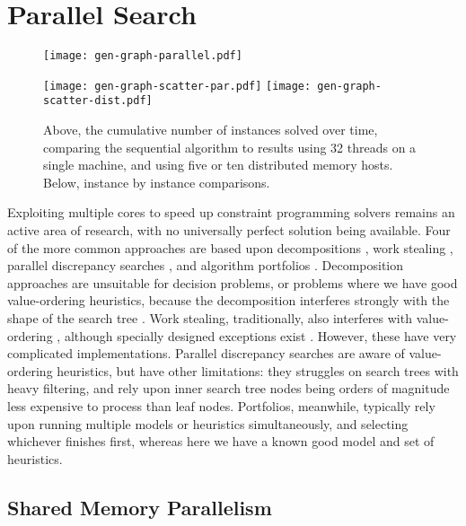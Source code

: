 \documentclass[runningheads]{llncs}
\begin{document}
\section{Parallel Search}

\begin{figure}[tb]
    \texttt{[image: gen-graph-parallel.pdf]}

    \medskip

    \texttt{[image: gen-graph-scatter-par.pdf]}
    \hfill
    \texttt{[image: gen-graph-scatter-dist.pdf]}

    \caption{Above, the cumulative number of instances solved over time, comparing the sequential
    algorithm to results using 32 threads on a single machine, and using five or ten distributed
    memory hosts. Below, instance by instance comparisons.}\label{figure:parallel}
\end{figure}

Exploiting multiple cores to speed up constraint programming solvers remains an active area of
research, with no universally perfect solution being available. Four of the more common approaches
are based upon decompositions
\cite{DBLP:journals/corr/abs-1008-4328,DBLP:journals/jair/MalapertRR16}, work stealing
\cite{DBLP:conf/cp/MichelSH07,DBLP:conf/cp/ChuSS09,DBLP:conf/cp/McCreeshP15,DBLP:conf/cpaior/HoffmannMNPRS018},
parallel discrepancy searches \cite{DBLP:conf/cp/MoisanGQ13,DBLP:conf/cpaior/MoisanQG14}, and
algorithm portfolios \cite{DBLP:conf/lion/LindauerHH15}. Decomposition approaches are unsuitable for
decision problems, or problems where we have good value-ordering heuristics, because the
decomposition interferes strongly with the shape of the search tree
\cite{DBLP:journals/jair/MalapertRR16}. Work stealing, traditionally, also interferes with
value-ordering \cite{DBLP:journals/topc/McCreeshP15}, although specially designed exceptions exist
\cite{DBLP:conf/cp/ChuSS09,DBLP:conf/cp/McCreeshP15,DBLP:conf/cpaior/HoffmannMNPRS018}. However,
these have very complicated implementations. Parallel discrepancy searches are aware of
value-ordering heuristics, but have other limitations: they struggles on search trees with heavy
filtering, and rely upon inner search tree nodes being orders of magnitude less expensive to process
than leaf nodes. Portfolios, meanwhile, typically rely upon running multiple models or heuristics
simultaneously, and selecting whichever finishes first, whereas here we have a known good model and
set of heuristics.

\subsection{Shared Memory Parallelism}
\end{document}
